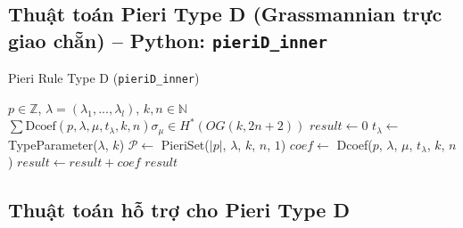 
\subsection*{Thuật toán Pieri Type D (Grassmannian trực giao chẵn) -- Python: \texttt{pieriD\_inner}}

\begin{algorithm}[H]
\caption{Pieri Rule Type D (\texttt{pieriD\_inner})}
\begin{algorithmic}[1]
\REQUIRE $p \in \mathbb{Z}$, $\lambda = (\lambda_1, ..., \lambda_l)$, $k, n \in \mathbb{N}$
\ENSURE $\sum \text{Dcoef}(p,\lambda,\mu,t_\lambda,k,n) \sigma_\mu \in H^*(OG(k,2n+2))$
\STATE $result \gets 0$
\STATE $t_\lambda \gets$ TypeParameter($\lambda$, $k$)
\STATE $\mathcal{P} \gets$ PieriSet($|p|$, $\lambda$, $k$, $n$, $1$)
    \STATE $coef \gets$ Dcoef($p$, $\lambda$, $\mu$, $t_\lambda$, $k$, $n$)
    \STATE $result \gets result + coef$
\ENDFOR
\RETURN $result$
\end{algorithmic}
\end{algorithm}

\subsection*{Thuật toán hỗ trợ cho Pieri Type D}



